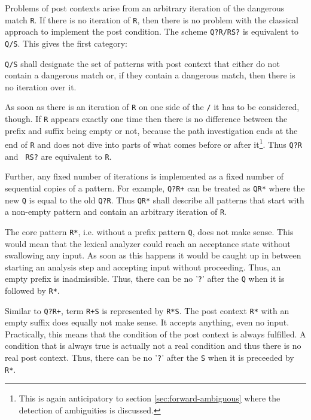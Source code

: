 Problems of post contexts arise from an arbitrary iteration of the dangerous match {\tt R}. If
there is no iteration of {\tt R}, then there
is no problem with the classical approach to implement the post condition. The
scheme {\tt Q?R/RS?} is equivalent to {\tt Q/S}. This gives the first category:

\begin{mycategory}
{\tt Q/S} shall designate the set of patterns with post context that either do not contain a
dangerous match or, if they contain a dangerous match, then there is no iteration over it.
\end{mycategory}

As soon as there is an iteration of {\tt R} on one side of the
\verb|/| it has to be considered, though. If {\tt R} appears exactly one time
then there is no difference between the prefix and suffix being empty or not,
because the path investigation ends at the end of {\tt R} and does not
dive into parts of what comes before or after it\footnote{This is again
anticipatory to section \ref{sec:forward-ambiguous} where the
detection of ambiguities is discussed.}.  Thus {\tt Q?R} and {\tt
RS?} are equivalent to {\tt R}.

Further, any fixed number of iterations is implemented as a fixed number of
sequential copies of a pattern. For example, {\tt Q?R+} can be treated as {\tt QR*}
where the new {\tt Q} is equal to the old {\tt Q?R}.
Thus {\tt QR*} shall describe all patterns that start with a non-empty pattern and
contain an arbitrary iteration of {\tt R}. 

The core pattern {\tt R*}, i.e. without a prefix pattern {\tt Q}, does not make sense.
This would mean that the lexical analyzer could reach an acceptance state
without swallowing any input. As soon as this happens it would be caught up in
between starting an analysis step and accepting input without proceeding. Thus,
an empty prefix is inadmissible. Thus, there can be no '{\tt ?}' after the {\tt Q}
when it is followed by {\tt R*}.

Similar to {\tt Q?R+}, term {\tt R+S} is represented by {\tt R*S}.  The post
context {\tt R*} with an empty suffix does equally not make sense.  It
accepts anything, even no input. Practically, this means that the
condition of the post context is always fulfilled. A condition that is always
true is actually not a real condition and thus  there is no real
post context. Thus, there can be no '{\tt ?}' after the {\tt S}
when it is preceeded by {\tt R*}.

